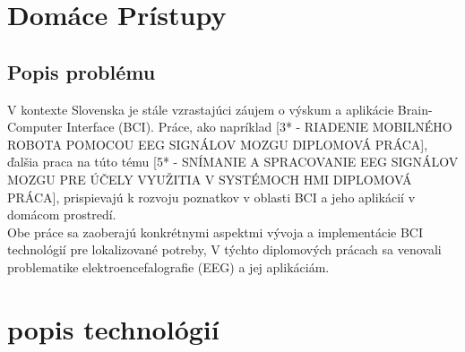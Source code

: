 \section{Domáce Prístupy}
\subsection{Popis problému}
\tab[5 mm] V kontexte Slovenska je stále vzrastajúci záujem o výskum a aplikácie Brain-Computer Interface (BCI). Práce, ako napríklad [3* - RIADENIE MOBILNÉHO ROBOTA POMOCOU EEG SIGNÁLOV MOZGU DIPLOMOVÁ PRÁCA], ďalšia praca na túto tému [5* - SNÍMANIE A SPRACOVANIE EEG SIGNÁLOV MOZGU PRE ÚČELY VYUŽITIA V SYSTÉMOCH HMI DIPLOMOVÁ PRÁCA], prispievajú k rozvoju poznatkov v oblasti BCI a jeho aplikácií v domácom prostredí.\\ 
\tab[5 mm] Obe práce sa zaoberajú konkrétnymi aspektmi vývoja a implementácie BCI technológií pre lokalizované potreby, V týchto diplomových prácach sa venovali problematike elektroencefalografie (EEG) a jej aplikáciám.

\section{popis technológií}
